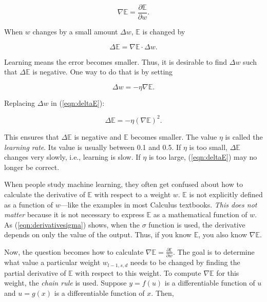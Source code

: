 \begin{equation}
\nabla \mathds{E} = \frac{\partial \mathds{E}}{\partial w}.
\end{equation}

When $w$ changes by a small amount $\Delta w$,
$\mathds{E}$ is changed by

\begin{equation}
\Delta \mathds{E} = \nabla \mathds{E} \cdot \Delta w.
\label{eqn:deltaE}
\end{equation}

Learning means the error becomes smaller. Thus, it is desirable to
find $\Delta w$ such that $\Delta \mathds{E}$ is negative.
One way to do that is by setting

\begin{equation}
\Delta w = - \eta \nabla \mathds{E}.
\end{equation}

Replacing $\Delta w$ in (\ref{eqn:deltaE}):

\begin{equation}
\Delta \mathds{E} = - \eta (\nabla \mathds{E})^2.
\end{equation}

This ensures that $\Delta \mathds{E}$ is negative and $\mathds{E}$
becomes smaller.  The value $\eta$ is called the {\it learning rate}.
Its value is usually between 0.1 and 0.5.  If $\eta$ is too small,
$\Delta \mathds{E}$ changes very slowly, i.e., learning is slow.  If
$\eta$ is too large, (\ref{eqn:deltaE}) may no longer be correct.

When people study machine learning, they often get confused about how
to calculate the derivative of $\mathds{E}$ with respect to a weight
$w$.  $\mathds{E}$ is not explicitly defined as a function of
$w$---like the examples in most Calculus textbooks.  {\it This does
not matter} because it is not necessary to express $\mathds{E}$ as a
mathematical function of $w$.  As (\ref{eqn:derivativesigma}) shows,
when the $\sigma$ function is used, the derivative depends on only the
value of the output.  Thus, if you know  $\mathds{E}$,
you also know $\nabla \mathds{E}$.

Now, the question becomes how to calculate $\nabla \mathds{E}
= \frac{\partial \mathds{E}}{\partial w}$.  The goal is to determine
what value a particular weight $w_{l-1, s, d}$ needs to be changed by
finding the partial derivative of $\mathds{E}$ with respect to this
weight.  To compute $\nabla \mathds{E}$ for this weight, the {\it
chain rule} is used.  Suppose $y = f(u)$ is a differentiable function
of $u$ and $u = g(x)$ is a differentiable function of $x$. Then,

